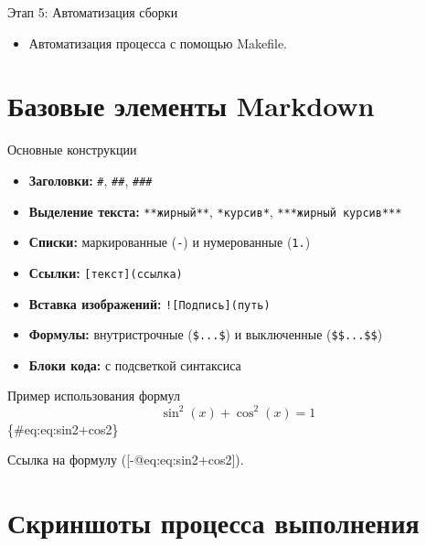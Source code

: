 \documentclass[
  ignorenonframetext,
  aspectratio=169,
  russian,
  aspectratio=169]{beamer}
\providecommand{\tightlist}{%
  \setlength{\itemsep}{0pt}\setlength{\parskip}{0pt}}
\begin{document}
\begin{frame}{Этап 5: Автоматизация сборки}
\label{ux44dux442ux430ux43f-5-ux430ux432ux442ux43eux43cux430ux442ux438ux437ux430ux446ux438ux44f-ux441ux431ux43eux440ux43aux438}
\begin{itemize}[<+->]
\tightlist
\item
  Автоматизация процесса с помощью Makefile.
\end{itemize}
\end{frame}

\section{Базовые элементы
Markdown}\label{ux431ux430ux437ux43eux432ux44bux435-ux44dux43bux435ux43cux435ux43dux442ux44b-markdown}

\begin{frame}[fragile]{Основные конструкции}
\label{ux43eux441ux43dux43eux432ux43dux44bux435-ux43aux43eux43dux441ux442ux440ux443ux43aux446ux438ux438}
\begin{itemize}[<+->]
\tightlist
\item
  \textbf{Заголовки:} \texttt{\#}, \texttt{\#\#}, \texttt{\#\#\#}
\item
  \textbf{Выделение текста:} \texttt{**жирный**}, \texttt{*курсив*},
  \texttt{***жирный\ курсив***}
\item
  \textbf{Списки:} маркированные (\texttt{-}) и нумерованные
  (\texttt{1.})
\item
  \textbf{Ссылки:} \texttt{{[}текст{]}(ссылка)}
\item
  \textbf{Вставка изображений:} \texttt{!{[}Подпись{]}(путь)}
\item
  \textbf{Формулы:} внутристрочные (\texttt{\$...\$}) и выключенные
  (\texttt{\$\$...\$\$})
\item
  \textbf{Блоки кода:} с подсветкой синтаксиса
\end{itemize}
\end{frame}

\begin{frame}{Пример использования формул}
\label{ux43fux440ux438ux43cux435ux440-ux438ux441ux43fux43eux43bux44cux437ux43eux432ux430ux43dux438ux44f-ux444ux43eux440ux43cux443ux43b}
\[
\sin^2 (x) + \cos^2 (x) = 1
\] \{\#eq:eq:sin2+cos2\}

Ссылка на формулу ({[}-@eq:eq:sin2+cos2{]}).
\end{frame}

\section{Скриншоты процесса
выполнения}\label{ux441ux43aux440ux438ux43dux448ux43eux442ux44b-ux43fux440ux43eux446ux435ux441ux441ux430-ux432ux44bux43fux43eux43bux43dux435ux43dux438ux44f}
\end{document}
